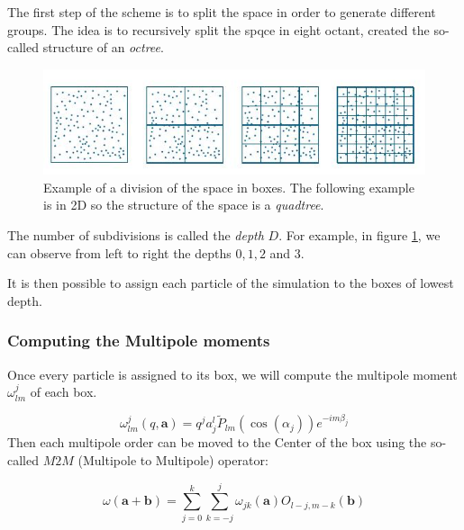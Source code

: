 \documentclass[12pt,twoside,a4paper]{report}
\begin{document}
	The first step of the scheme is to split the space in order to generate different groups. The idea is to recursively split the spqce in eight octant, created the so-called structure of an \textit{octree}. 
	
	\begin{figure}[H]
	

    \includegraphics[scale=0.9]{BoxDepth}
    
    \centering
 
    \caption{Example of a division of the space in boxes. The following example is in 2D so the structure of the space is a \textit{quadtree}.}
    
    \label{fig:depth}
     \end{figure}
	
    
    The number of subdivisions is called the \textit{depth} $D$. For example, in figure \ref{fig:depth}, we can observe from left to right the depths $0,1,2$ and $3$.
    
    It is then possible to assign each particle of the simulation to the boxes of lowest depth.
    
    \subsubsection{Computing the Multipole moments}
    
    Once every particle is assigned to its box, we will compute the multipole moment $\omega_{lm}^j$ of each box.
    
    \begin{equation}
    \omega_{lm}^{j}(q,\textbf{a}) = q^j a_j^l \widetilde{P}_{lm}(\cos(\alpha_j))e^{-im\beta_j}
    \end{equation}
%
Then each multipole order can be moved to the Center of the box using the so-called $M2M$ (Multipole to Multipole) operator:    
    
    \begin{equation}
    \omega(\textbf{a} + \textbf{b}) = \sum\limits_{j=0}^{k} \sum\limits_{k=-j}^{j} \omega_{jk}(\textbf{a}) O_{l-j,m-k}(\textbf{b})
    \end{equation}
\end{document}
